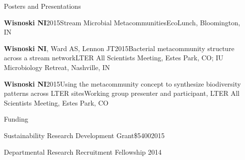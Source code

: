 \documentclass{resume} %
\begin{document}
\begin{rSection}{Posters and Presentations}

  \begin{Publication}{\bf Wisnoski NI}{2015}{Stream Microbial Metacommunities}{EcoLunch, Bloomington, IN}
  \end{Publication}

  \begin{Publication}{{\bf Wisnoski NI}, Ward AS, Lennon JT}{2015}{Bacterial metacommunity structure across a stream network}{LTER All Scientists Meeting, Estes Park, CO;  IU Microbiology Retreat, Nashville, IN}
  \end{Publication}

  \begin{Publication}{\bf Wisnoski NI}{2015}{Using the metacommunity concept to synthesize biodiversity patterns across LTER sites}{Working group presenter and participant, LTER All Scientists Meeting, Estes Park, CO}

  \end{Publication}


\end{rSection}


\begin{rSection}{Funding}

\begin{Grant}{Sustainability Research Development Grant}{\$5400}{2015}
\end{Grant}

\begin{Grant}{Departmental Research Recruitment Fellowship}{ }{2014}
\end{Grant}

\end{rSection}
\end{document}
